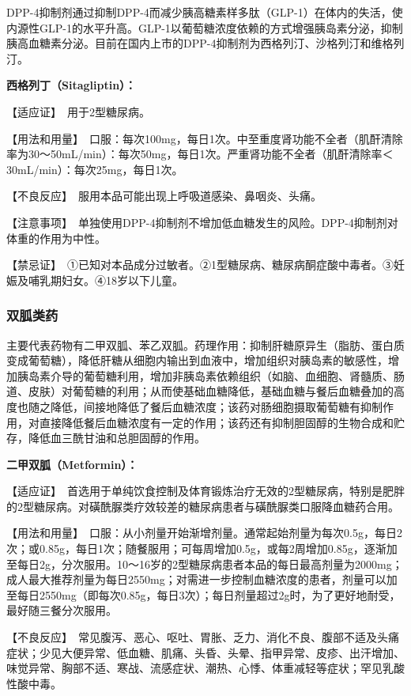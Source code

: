 DPP-4抑制剂通过抑制DPP-4而减少胰高糖素样多肽（GLP-1）在体内的失活，使内源性GLP-1的水平升高。GLP-1以葡萄糖浓度依赖的方式增强胰岛素分泌，抑制胰高血糖素分泌。目前在国内上市的DPP-4抑制剂为西格列汀、沙格列汀和维格列汀。

\textbf{西格列丁（Sitagliptin）：}

【适应证】　用于2型糖尿病。

【用法和用量】　口服：每次100mg，每日1次。中至重度肾功能不全者（肌酐清除率为30～50mL/min）：每次50mg，每日1次。严重肾功能不全者（肌酐清除率＜30mL/min）：每次25mg，每日1次。

【不良反应】　服用本品可能出现上呼吸道感染、鼻咽炎、头痛。

【注意事项】　单独使用DPP-4抑制剂不增加低血糖发生的风险。DPP-4抑制剂对体重的作用为中性。

【禁忌证】　①已知对本品成分过敏者。②1型糖尿病、糖尿病酮症酸中毒者。③妊娠及哺乳期妇女。④18岁以下儿童。

\subsubsection{双胍类药}

主要代表药物有二甲双胍、苯乙双胍。药理作用：抑制肝糖原异生（脂肪、蛋白质变成葡萄糖），降低肝糖从细胞内输出到血液中，增加组织对胰岛素的敏感性，增加胰岛素介导的葡萄糖利用，增加非胰岛素依赖组织（如脑、血细胞、肾髓质、肠道、皮肤）对葡萄糖的利用；从而使基础血糖降低，基础血糖与餐后血糖叠加的高度也随之降低，间接地降低了餐后血糖浓度；该药对肠细胞摄取葡萄糖有抑制作用，对直接降低餐后血糖浓度有一定的作用；该药还有抑制胆固醇的生物合成和贮存，降低血三酰甘油和总胆固醇的作用。

\textbf{二甲双胍（Metformin）：}

【适应证】　首选用于单纯饮食控制及体育锻炼治疗无效的2型糖尿病，特别是肥胖的2型糖尿病。对磺酰脲类疗效较差的糖尿病患者与磺酰脲类口服降血糖药合用。

【用法和用量】　口服：从小剂量开始渐增剂量。通常起始剂量为每次0.5g，每日2次；或0.85g，每日1次；随餐服用；可每周增加0.5g，或每2周增加0.85g，逐渐加至每日2g，分次服用。10～16岁的2型糖尿病患者本品的每日最高剂量为2000mg；成人最大推荐剂量为每日2550mg；对需进一步控制血糖浓度的患者，剂量可以加至每日2550mg（即每次0.85g，每日3次）；每日剂量超过2g时，为了更好地耐受，最好随三餐分次服用。

【不良反应】　常见腹泻、恶心、呕吐、胃胀、乏力、消化不良、腹部不适及头痛症状；少见大便异常、低血糖、肌痛、头昏、头晕、指甲异常、皮疹、出汗增加、味觉异常、胸部不适、寒战、流感症状、潮热、心悸、体重减轻等症状；罕见乳酸性酸中毒。

